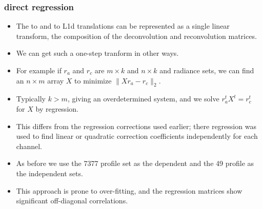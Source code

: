 \documentclass[10pt]{beamer}
\begin{document}
\begin{frame}
\frametitle{direct regression}
\begin{itemize}

  \item The {\airs} to {\cris} and {\airs} to L1d translations can
    be represented as a single linear transform, the composition of
    the deconvolution and reconvolution matrices.  

  \item We can get such a one-step tranform in other ways.

  \item For example if $r_a$ and $r_c$ are $m \times k$ and $n
    \times k$ {\airs} and {\cris} radiance sets, we can find an $n
    \times m$ array $X$ to minimize $\|X r_a - r_c\|_2$.

  \item Typically $k > m$, giving an overdetermined system, and we
    solve $r_a^t X^t = r_c^t$ for $X$ by regression.

  \item This differs from the regression corrections used earlier;
    there regression was used to find linear or quadratic correction
    coefficients independently for each channel.

  \item As before we use the 7377 profile set as the dependent and
    the 49 profile as the independent sets.

  \item This approach is prone to over-fitting, and the regression
    matrices show significant off-diagonal correlations.

\end{itemize}
\end{frame}
\end{document}
